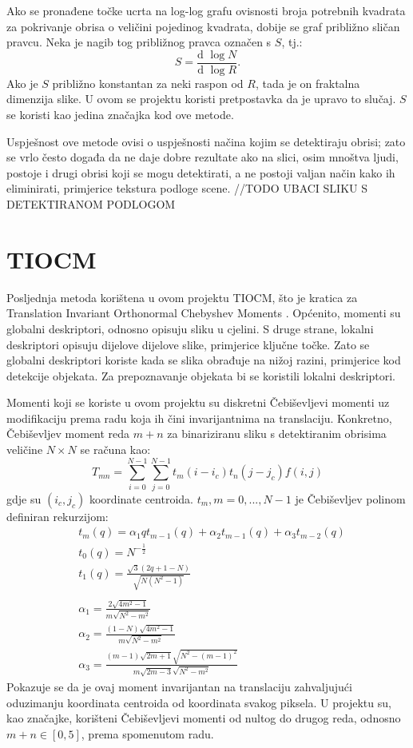 \documentclass{report}
\begin{document}
Ako se pronađene točke ucrta na log-log grafu ovisnosti broja potrebnih kvadrata za pokrivanje obrisa o veličini pojedinog kvadrata, dobije se graf približno sličan pravcu. Neka je nagib tog približnog pravca označen s $S$, tj.:
\begin{equation*}
S = \frac{\mbox{d }{\log N}}{\mbox{d }{\log R}}.
\end{equation*}
Ako je $S$ približno konstantan za neki raspon od $R$, tada je on fraktalna dimenzija slike. U ovom se projektu koristi pretpostavka da je upravo to slučaj. $S$ se koristi kao jedina značajka kod ove metode.

Uspješnost ove metode ovisi o uspješnosti načina kojim se detektiraju obrisi; zato se vrlo često događa da ne daje dobre rezultate ako na slici, osim mnoštva ljudi, postoje i drugi obrisi koji se mogu detektirati, a ne postoji valjan način kako ih eliminirati, primjerice tekstura podloge scene.
//TODO UBACI SLIKU S DETEKTIRANOM PODLOGOM

\section{TIOCM}
Posljednja metoda korištena u ovom projektu TIOCM, što je kratica za Translation Invariant Orthonormal Chebyshev Moments \citep{main_paper}. Općenito, momenti su globalni deskriptori, odnosno opisuju sliku u cjelini. S druge strane, lokalni deskriptori opisuju dijelove dijelove slike, primjerice ključne točke. Zato se globalni deskriptori koriste kada se slika obrađuje na nižoj razini, primjerice kod detekcije objekata. Za prepoznavanje objekata bi se koristili lokalni deskriptori.

Momenti koji se koriste u ovom projektu su diskretni Čebiševljevi momenti uz modifikaciju prema radu \cite{main_paper} koja ih čini invarijantnima na translaciju. Konkretno, Čebiševljev moment reda $m+n$ za binariziranu sliku s detektiranim obrisima veličine $N \times N$ se računa kao:
\begin{equation*}
T_{mn} = \sum_{i=0}^{N-1}\sum_{j=0}^{N-1}t_m(i-i_c)t_n(j-j_c)f(i,j)
\end{equation*}
gdje su $(i_c, j_c)$ koordinate centroida. $t_m, m = 0, ..., N-1$  je Čebiševljev polinom definiran rekurzijom:
\begin{align*}
&t_m(q) = \alpha_1 q t_{m-1}(q) + \alpha_2 t_{m-1}(q) + \alpha_3 t_{m-2}(q)\\
&t_0(q) = N^{-\frac{1}{2}}\\
&t_1(q) = \frac{\sqrt{3}(2q + 1 - N)}{\sqrt{N(N^2-1)}}\\
\\
&\alpha_1 = \frac{2\sqrt{4m^2 - 1}}{m\sqrt{N^2 - m^2}}\\
&\alpha_2 = \frac{(1-N)\sqrt{4m^2 - 1}}{m\sqrt{N^2 - m^2}}\\
&\alpha_3 = \frac{(m-1)\sqrt{2m+1}\sqrt{N^2-(m-1)^2}}{m\sqrt{2m - 3}\sqrt{N^2 - m^2}}
\end{align*}
Pokazuje se da je ovaj moment invarijantan na translaciju zahvaljujući oduzimanju koordinata centroida od koordinata svakog piksela. U projektu su, kao značajke, korišteni Čebiševljevi momenti od nultog do drugog reda, odnosno $m+n \in \left[0, 5\right]$, prema spomenutom radu.
\end{document}
